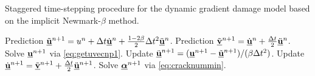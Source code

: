 \begin{algorithm*}[htbp]
\caption{Staggered time-stepping procedure for the dynamic gradient damage model based on the implicit Newmark-$\beta$ method.} \label{algo:implicit}
\begin{algorithmic}[1]\linespread{1.2}\selectfont\normalsize
{}
  \State Prediction $\tilde{\uvec}^{n+1}=u^n+\Delta t\dot{\uvec}^n+\frac{1-2\beta}{2}\Delta t^2\ddot{\uvec}^n$.
  \State Prediction $\tilde{\underline{\vec{v}}}^{n+1}=\dot{\uvec}^n+\frac{\Delta t}{2}\ddot{\uvec}^n$.
  \State Solve $\uvec^{n+1}$ via \eqref{eq:getuvecnp1}.
  \State Update $\ddot{\uvec}^{n+1}=(\uvec^{n+1}-\tilde{\uvec}^{n+1})/(\beta\Delta t^2)$.
  \State Update $\dot{\uvec}^{n+1}=\tilde{\underline{\vec{v}}}^{n+1}+\frac{\Delta t}{2}\ddot{\uvec}^{n+1}$.
  \State Solve $\dvec^{n+1}$ via \eqref{eq:cracknummin}.
\EndFor
\end{algorithmic}
\end{algorithm*}

